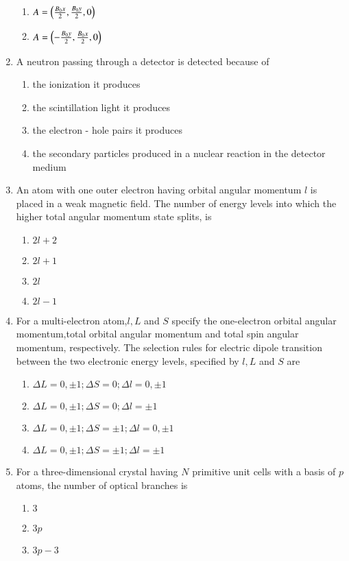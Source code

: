 \documentclass[journal,12pt,onecolumn]{IEEEtran}
\theoremstyle{remark}
\begin{document}
\begin{enumerate}[start=14]
\begin{enumerate}
		\item $A=\left(\frac{B_0x}{2},\frac{B_0y}{2},0\right)$ 
		\item $A=\left(-\frac{B_0y}{2},\frac{B_0x}{2},0\right)$ 
	\end{enumerate}
\item A neutron passing through a detector is detected because of
	\begin{enumerate}
\item the ionization it produces
\item the scintillation light it produces
\item the electron - hole pairs it produces 
\item the secondary particles produced in a nuclear reaction in the detector medium 
	\end{enumerate}
\item An atom with one outer electron having orbital angular momentum $l$ is placed in a weak magnetic field. The number of energy levels into which the higher total angular momentum state splits, is
	\begin{enumerate}
		\item $2l+2$
		\item $2l+1$
		\item $2l$
		\item $2l-1$
	\end{enumerate}
\item For a multi-electron atom,$l,L$ and $S$ specify the one-electron orbital angular momentum,total orbital angular momentum and total spin angular momentum, respectively. The selection rules for electric dipole transition between the two electronic energy levels, specified by $l,L$ and $S$ are
	\begin{enumerate}
\item $\Delta L=0,\pm1;\Delta S=0;\Delta l=0,\pm1$
\item $\Delta L=0,\pm1;\Delta S=0;\Delta l=\pm1$
\item $\Delta L=0,\pm1;\Delta S=\pm1;\Delta l=0,\pm1$
\item $\Delta L=0,\pm1;\Delta S=\pm1;\Delta l=\pm1$
	\end{enumerate}
\item For a three-dimensional crystal having $N$ primitive unit cells with a basis of $p$ atoms, the number of optical branches is
	\begin{enumerate}
		\item $3$
		\item $3p$
		\item $3p-3$

\end{enumerate}
\end{enumerate}
\end{document}
